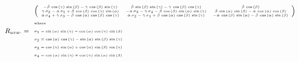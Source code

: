 \[
\tiny
R_{uvw \cdot} = 
\begin{array}{l}
	\left(\begin{array}{ccc}
		-\dot{\beta} \,\cos \left(\gamma \right)\,\sin \left(\beta \right) - \dot{\gamma} \,\cos \left(\beta \right)\,\sin \left(\gamma \right) & \dot{\beta} \,\sin \left(\beta \right)\,\sin \left(\gamma \right) - \dot{\gamma} \,\cos \left(\beta \right)\,\cos \left(\gamma \right) & \dot{\beta} \,\cos \left(\beta \right) \\
		\dot{\gamma} \,\sigma_2 - \dot{\alpha} \,\sigma_1 + \dot{\beta} \,\cos \left(\beta \right)\,\cos \left(\gamma \right)\,\sin \left(\alpha \right) & -\dot{\alpha} \,\sigma_3 - \dot{\gamma} \,\sigma_4 - \dot{\beta} \,\cos \left(\beta \right)\,\sin \left(\alpha \right)\,\sin \left(\gamma \right) & \dot{\beta} \,\sin \left(\alpha \right)\,\sin \left(\beta \right) - \dot{\alpha} \,\cos \left(\alpha \right)\,\cos \left(\beta \right) \\
		\dot{\alpha} \,\sigma_4 + \dot{\gamma} \,\sigma_3 - \dot{\beta} \,\cos \left(\alpha \right)\,\cos \left(\beta \right)\,\cos \left(\gamma \right) & \dot{\alpha} \,\sigma_2 - \dot{\gamma} \,\sigma_1 + \dot{\beta} \,\cos \left(\alpha \right)\,\cos \left(\beta \right)\,\sin \left(\gamma \right) & -\dot{\alpha} \,\cos \left(\beta \right)\,\sin \left(\alpha \right) - \dot{\beta} \,\cos \left(\alpha \right)\,\sin \left(\beta \right)
	\end{array}\right)\\
	\\
	\text{where}\\
	\\
	\sigma_1 = \sin \left(\alpha \right)\,\sin \left(\gamma \right) - \cos \left(\alpha \right)\,\cos \left(\gamma \right)\,\sin \left(\beta \right)\\
	\\
	\sigma_2 = \cos \left(\alpha \right)\,\cos \left(\gamma \right) - \sin \left(\alpha \right)\,\sin \left(\beta \right)\,\sin \left(\gamma \right)\\
	\\
	\sigma_3 = \cos \left(\gamma \right)\,\sin \left(\alpha \right) + \cos \left(\alpha \right)\,\sin \left(\beta \right)\,\sin \left(\gamma \right)\\
	\\
	\sigma_4 = \cos \left(\alpha \right)\,\sin \left(\gamma \right) + \cos \left(\gamma \right)\,\sin \left(\alpha \right)\,\sin \left(\beta \right)
\end{array}
\]


